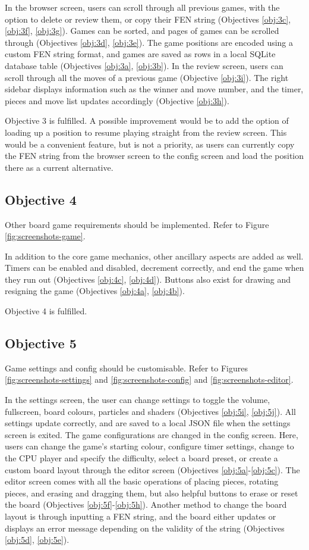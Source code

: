 \documentclass[../main/main.tex]{subfiles}
\begin{document}
In the browser screen, users can scroll through all previous games, with the option to delete or review them, or copy their FEN string (Objectives \ref{obj:3c}, \ref{obj:3f}, \ref{obj:3g}). Games can be sorted, and pages of games can be scrolled through (Objectives \ref{obj:3d}, \ref{obj:3e}). The game positions are encoded using a custom FEN string format, and games are saved as rows in a local SQLite database table (Objectives \ref{obj:3a}, \ref{obj:3b}). In the review screen, users can scroll through all the moves of a previous game (Objective \ref{obj:3i}). The right sidebar displays information such as the winner and move number, and the timer, pieces and move list updates accordingly (Objective \ref{obj:3h}).

Objective 3 is fulfilled. A possible improvement would be to add the option of loading up a position to resume playing straight from the review screen. This would be a convenient feature, but is not a priority, as users can currently copy the FEN string from the browser screen to the config screen and load the position there as a current alternative.

\subsection{Objective 4}
Other board game requirements should be implemented. Refer to Figure \ref{fig:screenshots-game}.

In addition to the core game mechanics, other ancillary aspects are added as well. Timers can be enabled and disabled, decrement correctly, and end the game when they run out (Objectives \ref{obj:4c}, \ref{obj:4d}). Buttons also exist for drawing and resigning the game (Objectives \ref{obj:4a}, \ref{obj:4b}).

Objective 4 is fulfilled.

\subsection{Objective 5}
Game settings and config should be customisable. Refer to Figures \ref{fig:screenshots-settings} and \ref{fig:screenshots-config} and \ref{fig:screenshots-editor}.

In the settings screen, the user can change settings to toggle the volume, fullscreen, board colours, particles and shaders (Objectives \ref{obj:5i}, \ref{obj:5j}). All settings update correctly, and are saved to a local JSON file when the settings screen is exited. The game configurations are changed in the config screen. Here, users can change the game's starting colour, configure timer settings, change to the CPU player and specify the difficulty, select a board preset, or create a custom board layout through the editor screen (Objectives \ref{obj:5a}-\ref{obj:5c}). The editor screen comes with all the basic operations of placing pieces, rotating pieces, and erasing and dragging them, but also helpful buttons to erase or reset the board (Objectives \ref{obj:5f}-\ref{obj:5h}). Another method to change the board layout is through inputting a FEN string, and the board either updates or displays an error message depending on the validity of the string (Objectives \ref{obj:5d}, \ref{obj:5e}).
\end{document}
